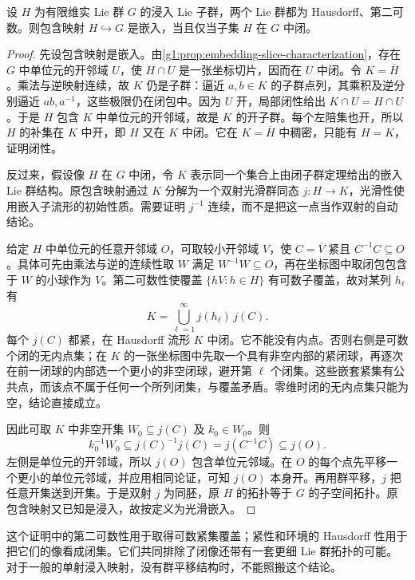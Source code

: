 \begin{proposition}\label{g1:prop:immersed-subgroup-closed-embedded}
	设 \(H\) 为有限维实 Lie 群 \(G\) 的浸入 Lie 子群，两个 Lie 群都为 Hausdorff、第二可数。则包含映射 \(H\hookrightarrow G\) 是嵌入，当且仅当子集 \(H\) 在 \(G\) 中闭。
\end{proposition}
\begin{proof}
	先设包含映射是嵌入。由\cref{g1:prop:embedding-slice-characterization}，存在 \(G\) 中单位元的开邻域 \(U\)，使 \(H\cap U\) 是一张坐标切片，因而在 \(U\) 中闭。令 \(K=\overline H\)。乘法与逆映射连续，故 \(K\) 仍是子群：逼近 \(a,b\in K\) 的子群点列，其乘积及逆分别逼近 \(ab,a^{-1}\)，这些极限仍在闭包中。因为 \(U\) 开，局部闭性给出 \(K\cap U=H\cap U\)。于是 \(H\) 包含 \(K\) 中单位元的开邻域，故是 \(K\) 的开子群。每个左陪集也开，所以 \(H\) 的补集在 \(K\) 中开，即 \(H\) 又在 \(K\) 中闭。它在 \(K=\overline H\) 中稠密，只能有 \(H=K\)，证明闭性。

	反过来，假设像 \(H\) 在 \(G\) 中闭，令 \(K\) 表示同一个集合上由闭子群定理给出的嵌入 Lie 群结构。原包含映射通过 \(K\) 分解为一个双射光滑群同态 \(j:H\to K\)，光滑性使用嵌入子流形的初始性质。需要证明 \(j^{-1}\) 连续，而不是把这一点当作双射的自动结论。

	给定 \(H\) 中单位元的任意开邻域 \(O\)，可取较小开邻域 \(V\)，使 \(C=\overline V\) 紧且 \(C^{-1}C\subseteq O\)。具体可先由乘法与逆的连续性取 \(W\) 满足 \(W^{-1}W\subseteq O\)，再在坐标图中取闭包包含于 \(W\) 的小球作为 \(V\)。第二可数性使覆盖 \(\{hV:h\in H\}\) 有可数子覆盖，故对某列 \(h_\ell\) 有
	\[
		K=\bigcup_{\ell=1}^{\infty}j(h_\ell)\,j(C).
	\]
	每个 \(j(C)\) 都紧，在 Hausdorff 流形 \(K\) 中闭。它不能没有内点。否则右侧是可数个闭的无内点集；在 \(K\) 的一张坐标图中先取一个具有非空内部的紧闭球，再逐次在前一闭球的内部选一个更小的非空闭球，避开第 \(\ell\) 个闭集。这些嵌套紧集有公共点，而该点不属于任何一个所列闭集，与覆盖矛盾。零维时闭的无内点集只能为空，结论直接成立。

	因此可取 \(K\) 中非空开集 \(W_0\subseteq j(C)\) 及 \(k_0\in W_0\)。则
	\[
		k_0^{-1}W_0\subseteq j(C)^{-1}j(C)
		=j(C^{-1}C)\subseteq j(O).
	\]
	左侧是单位元的开邻域，所以 \(j(O)\) 包含单位元邻域。在 \(O\) 的每个点先平移一个更小的单位元邻域，并应用相同论证，可知 \(j(O)\) 本身开。再用群平移，\(j\) 把任意开集送到开集。于是双射 \(j\) 为同胚，原 \(H\) 的拓扑等于 \(G\) 的子空间拓扑。原包含映射又已知是浸入，故按定义为光滑嵌入。
\end{proof}

这个证明中的第二可数性用于取得可数紧集覆盖；紧性和环境的 Hausdorff 性用于把它们的像看成闭集。它们共同排除了闭像还带有一套更细 Lie 群拓扑的可能。对于一般的单射浸入映射，没有群平移结构时，不能照搬这个结论。

